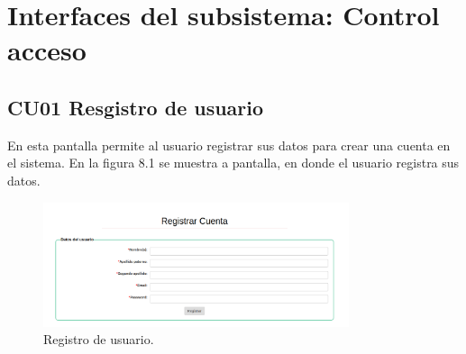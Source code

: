 
\section{Interfaces del subsistema: Control acceso}

\subsection{CU01 Resgistro de usuario}
{
\justify
{}
}

\justify
En esta pantalla permite al usuario registrar sus datos para crear una cuenta en el sistema.
{
\justify
{}
}
\justify
En la figura 8.1 se muestra a pantalla, en donde el usuario registra sus datos.

\begin{figure}[htb]
\centering
\includegraphics[width=0.8\textwidth]{./images/cu01-registro-usuario.png}
\caption{Registro de usuario.} \label{fig:IU01}
\end{figure}